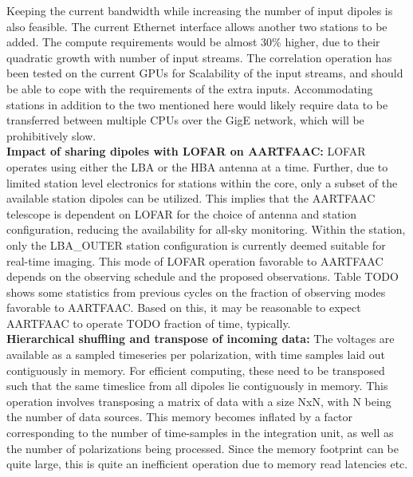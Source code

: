\documentclass{ws-jai}
\begin{document}
Keeping the  current bandwidth while increasing  the number of input  dipoles is
also feasible. The current Ethernet interface  allows another two stations to be
added.   The compute  requirements would  be almost  30\% higher,  due to  their
quadratic growth  with number of  input streams.  The correlation  operation has
been tested on the current GPUs for Scalability of the input streams, and should
be  able to  cope  with the  requirements of  the  extra inputs.   Accommodating
stations in addition to  the two mentioned here would likely  require data to be
transferred  between  multiple  CPUs  over  the  GigE  network,  which  will  be
prohibitively slow.\\

\noindent  \textbf {Impact  of sharing  dipoles with  LOFAR on  AARTFAAC:} LOFAR
operates using  either the LBA  or the  HBA antenna at  a time. Further,  due to
limited station level electronics for stations within the core, only a subset of
the available  station dipoles can be  utilized. This implies that  the AARTFAAC
telescope  is  dependent  on  LOFAR  for  the  choice  of  antenna  and  station
configuration,  reducing the  availability  for all-sky  monitoring. Within  the
station, only the LBA\_OUTER station configuration is currently deemed suitable
for  real-time imaging.   This mode  of  LOFAR operation  favorable to  AARTFAAC
depends on  the observing  schedule and the  proposed observations.   Table TODO
shows some  statistics from previous cycles  on the fraction of  observing modes
favorable to AARTFAAC. Based on this, it  may be reasonable to expect AARTFAAC to
operate TODO fraction of time, typically.\\

\noindent \textbf {Hierarchical  shuffling and transpose of  incoming data:} The
voltages  are available  as a  sampled  timeseries per  polarization, with  time
samples laid out contiguously in memory.  For efficient computing, these need to
be transposed such that the same  timeslice from all dipoles lie contiguously in
memory. This  operation involves transposing a  matrix of data with  a size NxN,
with N  being the  number of data  sources.  This memory  becomes inflated  by a
factor corresponding  to the number of  time-samples in the integration  unit, as
well as the number of polarizations  being processed. Since the memory footprint
can be quite  large, this is quite  an inefficient operation due  to memory read
latencies etc.\\
\end{document}
